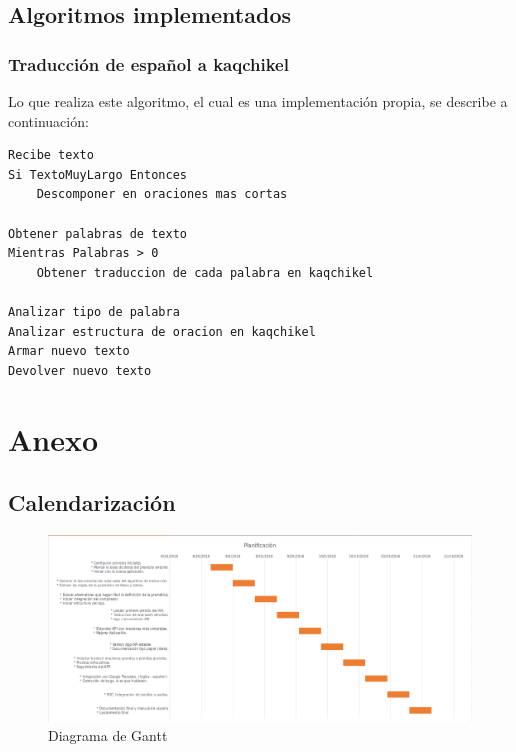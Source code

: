 \documentclass[a4paper,openright,11pt]{article}
\begin{document}
\subsection{Algoritmos implementados}
\subsubsection{Traducción de español a kaqchikel}
Lo que realiza este algoritmo, el cual es una implementación propia, se describe a continuación:

\begin{lstlisting}
Recibe texto
Si TextoMuyLargo Entonces
	Descomponer en oraciones mas cortas
	
Obtener palabras de texto
Mientras Palabras > 0
	Obtener traduccion de cada palabra en kaqchikel
	
Analizar tipo de palabra
Analizar estructura de oracion en kaqchikel
Armar nuevo texto
Devolver nuevo texto
\end{lstlisting}
\newpage

\section{Anexo}
\subsection{Calendarización}
\begin{figure}[h]
  \centering
    \includegraphics[width=1.0\textwidth]{Gantt}
  \caption{Diagrama de Gantt}
  \label{fig:gantt}
\end{figure}
\end{document}
